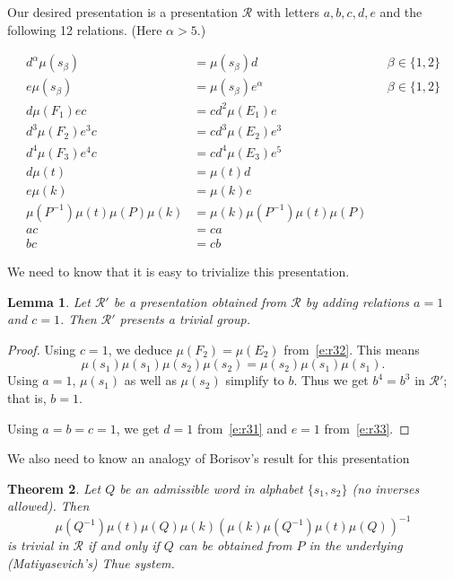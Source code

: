 \documentclass[10pt,a4paper]{article}
\newtheorem{theorem}{Theorem}
\newtheorem{lemma}[theorem]{Lemma}
\theoremstyle{definition}
\theoremstyle{remark}
\newcommand\RR{\mathcal{R}}
\begin{document}
Our desired presentation is a presentation $\RR$ with letters $a, b, c, d, e$
and the following 12 relations. (Here $\alpha > 5$.)

\begin{align*}
  d^{\alpha} \mu(s_\beta) &= \mu(s_\beta) d & &\beta \in \{1,2\} \tag{R1}
  \label{e:r1} \\
  e\mu(s_{\beta}) &= \mu(s_{\beta})e^{\alpha} & &\beta \in \{1,2\} \tag{R2}
  \label{e:r2} \\
  d\mu(F_1)ec &= cd^2\mu(E_1)e & \tag{R3.1} \label{e:r31} \\
  d^3\mu(F_2)e^3c &= cd^3\mu(E_2)e^3 & \tag{R3.2} \label{e:r32} \\
  d^4\mu(F_3)e^4c &= cd^4\mu(E_3)e^5& \tag{R3.3} \label{e:r33} \\
  d\mu(t) &= \mu(t)d & \tag{R4} \label{e:r4} \\
  e\mu(k) &= \mu(k)e & \tag{R5} \label{e:r5} \\
  \mu(P^{-1})\mu(t)\mu(P)\mu(k) &= \mu(k)\mu(P^{-1})\mu(t)\mu(P) &
  \label{e:r6}  \tag{R6} \\
  ac &= ca & \tag{R7} \label{e:r7} \\
  bc &= cb & \tag{R8} \label{e:r8}
\end{align*}

We need to know that it is easy to trivialize this presentation.

\begin{lemma}
\label{l:trivialize_R}
  Let $\RR'$ be a presentation obtained from $\RR$ by adding relations $a = 1$
  and $c = 1$. Then $\RR'$ presents a trivial group.
\end{lemma}
\begin{proof}
  Using $c = 1$, we deduce $\mu(F_2) = \mu(E_2)$ from~\eqref{e:r32}. This means
  \[
	  \mu(s_1) \mu(s_1) \mu(s_2) \mu(s_2) = \mu(s_2)\mu(s_1) \mu(s_1).
  \]
  Using $a = 1$, $\mu(s_1)$ as well as $\mu(s_2)$ simplify to $b$. Thus we get
  $b^4 = b^3$ in $\RR'$; that is, $b = 1$.

  Using $a = b= c = 1$, we get $d = 1$ from~\eqref{e:r31} and $e=1$
  from~\eqref{e:r33}.
\end{proof}

We also need to know an analogy of Borisov's result for this presentation

\begin{theorem}
\label{t:R_word_unsolvable}
  Let $Q$ be an admissible word in alphabet $\{s_1, s_2\}$ (no inverses
  allowed). Then 
  \[\mu(Q^{-1})\mu(t)\mu(Q)\mu(k)(\mu(k)\mu(Q^{-1})\mu(t)\mu(Q))^{-1}\]
  is trivial in $\RR$
  if and only if $Q$ can be obtained from $P$ in the underlying
  (Matiyasevich's) Thue system.
\end{theorem}
\end{document}
